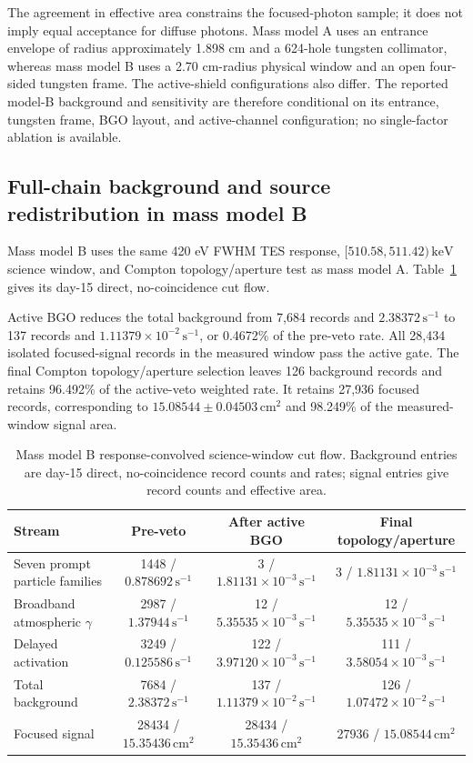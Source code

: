 \documentclass[11pt]{article}
\newcommand{\keV}{\ensuremath{\,\mathrm{keV}}}
\newcommand{\cps}{\ensuremath{\,\mathrm{s^{-1}}}}
\begin{document}
The agreement in effective area constrains the focused-photon sample; it does not imply equal acceptance for diffuse photons. Mass model A uses an entrance envelope of radius approximately 1.898 cm and a 624-hole tungsten collimator, whereas mass model B uses a 2.70 cm-radius physical window and an open four-sided tungsten frame. The active-shield configurations also differ. The reported model-B background and sensitivity are therefore conditional on its entrance, tungsten frame, BGO layout, and active-channel configuration; no single-factor ablation is available.

\FloatBarrier

\subsection{Full-chain background and source redistribution in mass model B}
\label{subsec:optimized_fullchain}

Mass model B uses the same 420 eV FWHM TES response, $[510.58,511.42)\keV$ science window, and Compton topology/aperture test as mass model A. Table~\ref{tab:optimized_cutflow} gives its day-15 direct, no-coincidence cut flow.

Active BGO reduces the total background from 7,684 records and $2.38372\cps$ to 137 records and $1.11379\times10^{-2}\cps$, or 0.4672\% of the pre-veto rate. All 28,434 isolated focused-signal records in the measured window pass the active gate. The final Compton topology/aperture selection leaves 126 background records and retains 96.492\% of the active-veto weighted rate. It retains 27,936 focused records, corresponding to $15.08544\pm0.04503\,\mathrm{cm^2}$ and 98.249\% of the measured-window signal area.

\begin{table}[H]
\centering
\caption{Mass model B response-convolved science-window cut flow. Background entries are day-15 direct, no-coincidence record counts and rates; signal entries give record counts and effective area.}
\label{tab:optimized_cutflow}
\footnotesize
\begin{tabular}{lccc}
\toprule
Stream & Pre-veto & After active BGO & Final topology/aperture \\
\midrule
Seven prompt particle families & 1448 / $0.878692\cps$ & 3 / $1.81131\times10^{-3}\cps$ & 3 / $1.81131\times10^{-3}\cps$ \\
Broadband atmospheric $\gamma$ & 2987 / $1.37944\cps$ & 12 / $5.35535\times10^{-3}\cps$ & 12 / $5.35535\times10^{-3}\cps$ \\
Delayed activation & 3249 / $0.125586\cps$ & 122 / $3.97120\times10^{-3}\cps$ & 111 / $3.58054\times10^{-3}\cps$ \\
Total background & 7684 / $2.38372\cps$ & 137 / $1.11379\times10^{-2}\cps$ & 126 / $1.07472\times10^{-2}\cps$ \\
Focused signal & 28434 / $15.35436\,\mathrm{cm^2}$ & 28434 / $15.35436\,\mathrm{cm^2}$ & 27936 / $15.08544\,\mathrm{cm^2}$ \\
\bottomrule
\end{tabular}
\end{table}
\end{document}
